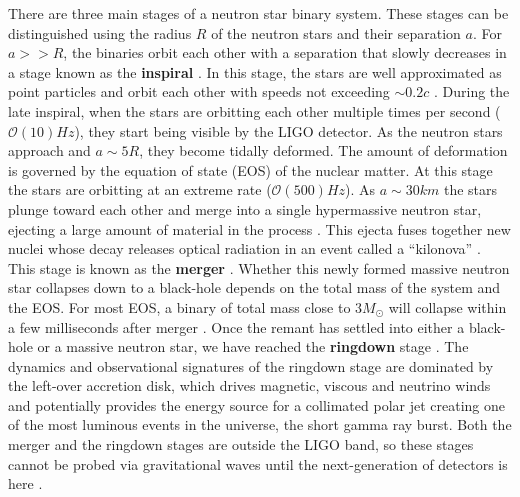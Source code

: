 There are three main stages of a neutron star binary system. These stages can be distinguished using the radius $R$ of the neutron stars and their separation $a$. For $a >> R$, the binaries orbit each other with a separation that slowly decreases in a stage known as the \textbf{inspiral} \cite{faber2012binary,baumgarte2010numerical,shibata2015numerical,rezzolla2013relativistic}. In this stage, the stars are well approximated as point particles and orbit each other with speeds not exceeding $\sim 0.2c$ \cite{shibata2015numerical}. During the late inspiral, when the stars are orbitting each other multiple times per second ($\mathcal{O}(10) Hz$), they start being visible by the LIGO detector. As the neutron stars approach and $a\sim 5R$, they become tidally deformed. The amount of deformation is governed by the equation of state (EOS) of the nuclear matter. At this stage the stars are orbitting at an extreme rate ($\mathcal{O}(500) Hz$). As $a \sim 30km$ the stars plunge toward each other and merge into a single hypermassive neutron star, ejecting a large amount of material in the process \cite{shibata2015numerical}. This ejecta fuses together new nuclei whose decay releases optical radiation in an event called a ``kilonova'' \cite{metzger:16}. This stage is known as the \textbf{merger} \cite{faber2012binary,baumgarte2010numerical,shibata2015numerical,rezzolla2013relativistic}. Whether this newly formed massive neutron star collapses down to a black-hole depends on the total mass of the system and the EOS. For most EOS, a binary of total mass close to $3M_\odot$ will collapse within a few milliseconds after merger \cite{bauswein2013prompt}. Once the remant has settled into either a black-hole or a massive neutron star, we have reached the \textbf{ringdown} stage \cite{faber2012binary,baumgarte2010numerical,shibata2015numerical,rezzolla2013relativistic}. The dynamics and observational signatures of the ringdown stage are dominated by the left-over accretion disk, which drives magnetic, viscous and neutrino winds and potentially provides the energy source for a collimated polar jet creating one of the most luminous events in the universe, the short gamma ray burst. Both the merger and the ringdown stages are outside the LIGO band, so these stages cannot be probed via gravitational waves until the next-generation of detectors is here \cite{Abbott:2017dke}.

